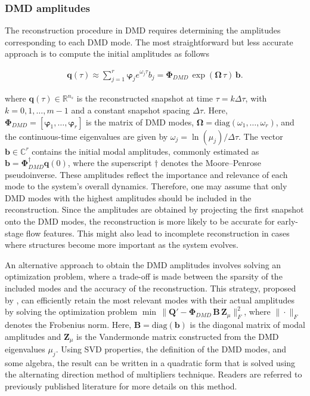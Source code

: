 \documentclass[a4paper,fleqn]{cas-sc}
\begin{document}
	\subsubsection{DMD amplitudes}
	\label{DMD amplitudes}
	
	The reconstruction procedure in DMD requires determining the amplitudes corresponding to each DMD mode. The most straightforward but less accurate approach is to compute the initial amplitudes as follows \cite{Kutz2016}
	
	\begin{align}
		\mathbf{q}(\tau)\approx \sum_{j=1}^{r} \boldsymbol{\varphi}_j e^{\omega_j \tau} b_j = \mathbf{\Phi}_{DMD}\,\exp (\mathbf{\Omega}\, \tau)\,\mathbf{b}.
		\label{eq 10}
	\end{align}
	
	\noindent where $\mathbf{q}(\tau)\in\mathbb{R}^{n_s}$ is the reconstructed snapshot at time $\tau=k\Delta\tau$, with $k=0,1,\ldots,m-1$ and a constant snapshot spacing $\Delta\tau$. Here, $\mathbf{\Phi}_{DMD}=[\boldsymbol{\varphi}_1,\ldots,\boldsymbol{\varphi}_r]$ is the matrix of DMD modes, $\mathbf{\Omega}=\mathrm{diag}(\omega_1,\ldots,\omega_r)$, and the continuous-time eigenvalues are given by $\omega_j=\ln(\mu_j)/\Delta\tau$. The vector $\mathbf{b}\in\mathbb{C}^{r}$ contains the initial modal amplitudes, commonly estimated as $\mathbf{b}=\mathbf{\Phi}_{DMD}^{\dagger}\mathbf{q}(0)$, where the superscript $\dagger$ denotes the Moore--Penrose pseudoinverse. These amplitudes reflect the importance and relevance of each mode to the system's overall dynamics. Therefore, one may assume that only DMD modes with the highest amplitudes should be included in the reconstruction. Since the amplitudes are obtained by projecting the first snapshot onto the DMD modes, the reconstruction is more likely to be accurate for early-stage flow features. This might also lead to incomplete reconstruction in cases where structures become more important as the system evolves. 
	
	An alternative approach to obtain the DMD amplitudes involves solving an optimization problem, where a trade-off is made between the sparsity of the included modes and the accuracy of the reconstruction. This strategy, proposed by \citet{Jovanovic2014}, can efficiently retain the most relevant modes with their actual amplitudes by solving the optimization problem $\min\,\|\mathbf{Q}' - \mathbf{\Phi}_{DMD}\, \mathbf{B}\, \mathbf{Z}_{\mu}\|_F^2$, where $\|\cdot\|_F$ denotes the Frobenius norm. Here, $\mathbf{B}=\mathrm{diag}(\mathbf{b})$ is the diagonal matrix of modal amplitudes and $\mathbf{Z}_{\mu}$ is the Vandermonde matrix constructed from the DMD eigenvalues $\mu_j$. Using SVD properties, the definition of the DMD modes, and some algebra, the result can be written in a quadratic form that is solved using the alternating direction method of multipliers technique. Readers are referred to previously published literature \cite{Jovanovic2014,Schmid2023} for more details on this method. 
	
\end{document}
